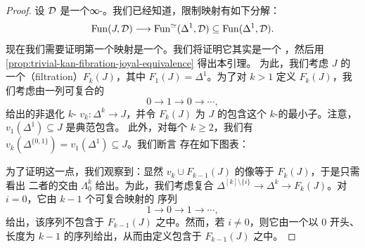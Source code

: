 \begin{proof}
设 $\mathcal{D}$ 是一个∞-\trCategory{}。我们已经知道，限制映射有如下分解：
\[
\mathrm{Fun}(J, \mathcal{D}) \longrightarrow \mathrm{Fun}^{\simeq}(\Delta^1, \mathcal{D})
\subseteq \mathrm{Fun}(\Delta^1, \mathcal{D}).
\]
现在我们需要证明第一个映射是一个\trJoyalEquivalence{}。我们将证明它其实是一个%
\trTrivialFibration{}，然后用\cref{prop:trivial-kan-fibration-joyal-equivalence} 得出本引理。
为此，我们考虑 $J$ 的一个\trFiltration{}（filtration）$F_k(J)$，其中 $F_1(J) = \Delta^1$。为了对
$k > 1$ 定义 $F_k(J)$，我们考虑由一列可复合的\trMorphism{}%
\[
0 \to 1 \to 0 \to \dotsb,
\]
给出的非退化 $k$-\trSimplex{} $v_k\colon \Delta^k \to J$，并令 $F_k(J)$ 为 $J$ 的包含这个
$k$-\trSimplex{}的最小子\trSimplicialSet{}。注意，$v_1(\Delta^1) \subseteq J$ 是典范包含。
此外，对每个 $k \ge 2$，我们有 $v_k(\Delta^{\{0,1\}}) = v_1(\Delta^1) \subseteq J$。我们断言
存在如下\trPushout{}图表：
\begin{center}
\end{center}
为了证明这一点，我们观察到：显然 $v_k \cup F_{k-1}(J)$ 的像等于 $F_k(J)$，于是只需看出
二者的交由 $\Lambda^k_0$ 给出。为此，我们考虑复合
$\Delta^{[k]\setminus\{i\}} \to \Delta^k \to F_k(J)$。对 $i = 0$，它由 $k-1$ 个可复合映射的
序列
\[
1 \to 0 \to 1 \to \dotsb,
\]
给出，该序列不包含于 $F_{k-1}(J)$ 之中。然而，若 $i \neq 0$，则它由一个以 $0$ 开头、
长度为 $k-1$ 的序列给出，从而由定义包含于 $F_{k-1}(J)$ 之中。


\end{proof}
